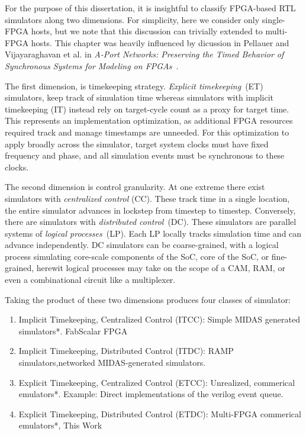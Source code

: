 
For the purpose of this dissertation, it is insightful to classify FPGA-based
RTL simulators along two dimensions. For simplicity, here we consider only
single-FPGA hosts, but we note that this discussion can trivially extended to
multi-FPGA hosts. This chapter was heavily influenced by dicussion in Pellauer
and Vijayaraghavan et al. in \emph{A-Port Networks: Preserving the Timed
Behavior of Synchronous Systems for Modeling on FPGAs}~\cite{APortNetwork}.

The first dimension, is timekeeping strategy. \emph{Explicit timekeeping}~(ET)
simulators, keep track of simulation time whereas simulators with implicit
timekeeping (IT) instead rely on target-cycle count as a proxy for target time. This represents an
implementation optimization, as additional FPGA resources required track and
manage timestamps are unneeded. For this optimization to apply broadly across
the simulator, target system clocks must have fixed frequency and phase, and
all simulation events must be synchronous to these clocks.

The second dimension is control granularity. At one extreme there exist
simulators with \emph{centralized control} (CC). These track time in
a single location, the entire simulator advances in lockstep from
timestep to timestep.  Conversely, there are simulators with \emph{distributed
control}~(DC). These simulators are parallel systems of \emph{logical
processes}~(LP). Each LP locally tracks simulation time and can advance
independently. DC simulators can be coarse-grained, with a logical process
simulating core-scale components of the SoC, core of the SoC, or fine-grained,
herewit logical processes may take on the scope of a CAM, RAM, or even a
combinational circuit like a multiplexer.

Taking the product of these two dimensions produces four classes of simulator:

\begin{enumerate}
\item{Implicit Timekeeping, Centralized Control (ITCC)}: Simple MIDAS generated simulators*. FabScalar FPGA

\item{Implicit Timekeeping, Distributed Control (ITDC)}: RAMP simulators,networked MIDAS-generated simulators.

\item{Explicit Timekeeping, Centralized Control (ETCC)}: Unrealized, commerical emulators*. Example: Direct implementations of the verilog event queue.

\item{Explicit Timekeeping, Distributed Control (ETDC)}: Multi-FPGA commerical emulators*, This Work
\end{enumerate}

